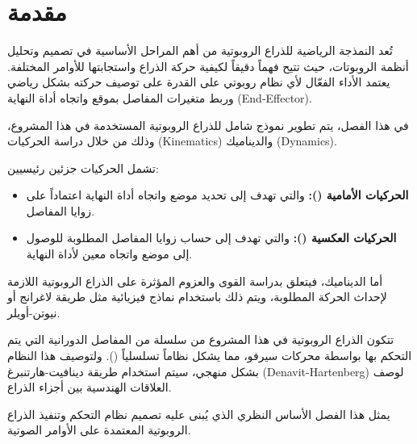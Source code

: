 \section{مقدمة}

تُعد النمذجة الرياضية للذراع الروبوتية من أهم المراحل الأساسية في تصميم وتحليل أنظمة الروبوتات، حيث تتيح فهماً دقيقاً لكيفية حركة الذراع واستجابتها للأوامر المختلفة. يعتمد الأداء الفعّال لأي نظام روبوتي على القدرة على توصيف حركته بشكل رياضي وربط متغيرات المفاصل بموقع واتجاه أداة النهاية (End-Effector).

في هذا الفصل، يتم تطوير نموذج شامل للذراع الروبوتية المستخدمة في هذا المشروع، وذلك من خلال دراسة الحركيات (Kinematics) والديناميك (Dynamics).

تشمل الحركيات جزئين رئيسيين:
\begin{itemize}
    \item \textbf{الحركيات الأمامية ():} والتي تهدف إلى تحديد موضع واتجاه أداة النهاية اعتماداً على زوايا المفاصل.
    
    \item \textbf{الحركيات العكسية ():} والتي تهدف إلى حساب زوايا المفاصل المطلوبة للوصول إلى موضع واتجاه معين لأداة النهاية.
\end{itemize}

أما الديناميك، فيتعلق بدراسة القوى والعزوم المؤثرة على الذراع الروبوتية اللازمة لإحداث الحركة المطلوبة، ويتم ذلك باستخدام نماذج فيزيائية مثل طريقة لاغرانج أو نيوتن-أويلر.

تتكون الذراع الروبوتية في هذا المشروع من سلسلة من المفاصل الدورانية التي يتم التحكم بها بواسطة محركات سيرفو، مما يشكل نظاماً تسلسلياً (). ولتوصيف هذا النظام بشكل منهجي، سيتم استخدام طريقة دينافيت-هارتنبرغ (Denavit-Hartenberg) لوصف العلاقات الهندسية بين أجزاء الذراع.

يمثل هذا الفصل الأساس النظري الذي يُبنى عليه تصميم نظام التحكم وتنفيذ الذراع الروبوتية المعتمدة على الأوامر الصوتية.

